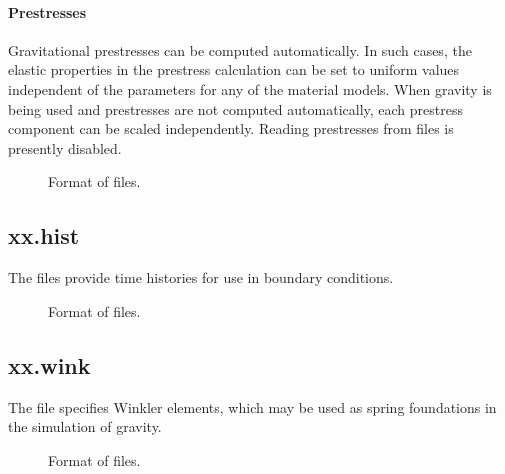 \paragraph{Prestresses}

Gravitational prestresses can be computed automatically. In such
cases, the elastic properties in the prestress calculation can be set
to uniform values independent of the parameters for any of the
material models. When gravity is being used and prestresses are not
computed automatically, each prestress component can be scaled
independently. Reading prestresses from files is presently disabled.

\begin{figure}[htbp]
  \begin{center}
    
  \caption{Format of  files.}
  \end{center}
\end{figure}

\subsection{xx.hist}

The  files provide time histories for use in
boundary conditions.

\begin{figure}
  \begin{center}
    
    \caption{Format of  files.}
  \end{center}
\end{figure}

\subsection{xx.wink}

The  file specifies Winkler elements, which may be
used as spring foundations in the simulation of gravity.

\begin{figure}
  \begin{center}
    
    \caption{Format of  files.}
  \end{center}
\end{figure}
